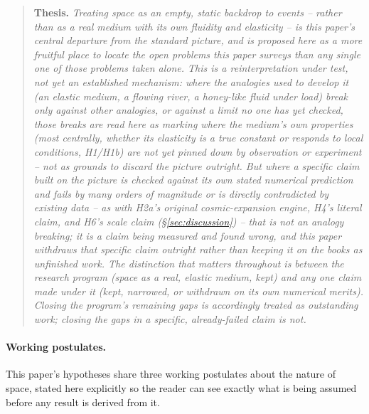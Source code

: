 \documentclass[12pt, a4paper]{article}
\begin{document}
\begin{quote}
\textbf{Thesis.}
\emph{Treating space as an empty, static backdrop to events --
rather than as a real medium with its own fluidity and elasticity --
is this paper's central departure from the standard picture, and is
proposed here as a more fruitful place to locate the open problems
this paper surveys than any single one of those problems taken alone.
This is a reinterpretation under test, not yet an established
mechanism: where the analogies used to develop it (an elastic medium,
a flowing river, a honey-like fluid under load) break only against
other analogies, or against a limit no one has yet checked, those
breaks are read here as marking where the medium's own properties
(most centrally, whether its elasticity is a true constant or
responds to local conditions, H1/H1b) are not yet pinned down by
observation or experiment -- not as grounds to discard the picture
outright. But where a specific claim built on the picture is checked
against its own stated numerical prediction and fails by many orders
of magnitude or is directly contradicted by existing data -- as with
H2a's original cosmic-expansion engine, H4's literal claim, and H6's
scale claim (\S\ref{sec:discussion}) -- that is not an analogy
breaking; it is a claim being measured and found wrong, and this paper
withdraws that specific claim outright rather than keeping it on the
books as unfinished work. The distinction that matters throughout is
between the research program (space as a real, elastic medium, kept)
and any one claim made under it (kept, narrowed, or withdrawn on its
own numerical merits). Closing the program's remaining gaps is
accordingly treated as outstanding work; closing the gaps in a
specific, already-failed claim is not.}
\end{quote}

\paragraph{Working postulates.}
This paper's hypotheses share three working postulates about the
nature of space, stated here explicitly so the reader can see exactly
what is being assumed before any result is derived from it.
\end{document}

